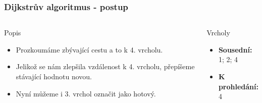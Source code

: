 \documentclass{beamer}
\begin{document}
\begin{frame}
    \frametitle{Dijkstrův algoritmus - postup}
    \begin{columns}
        \begin{block}{Popis}
            \begin{itemize}
                \item Prozkoumáme zbývající cestu a to k 4. vrcholu.
                \item Jelikož se nám zlepšila vzdálenost k 4. vrcholu, přepíšeme stávající hodnotu novou.
                \item Nyní můžeme i 3. vrchol označit jako hotový.
            \end{itemize}
        \end{block}
        \begin{block}{Vrcholy}
            \begin{itemize}
                \item \textbf{Sousední:} 1; 2; 4 
                \item \textbf{K prohledání:} 4
            \end{itemize}
        \end{block}
    \end{columns}
\end{frame}
\end{document}
